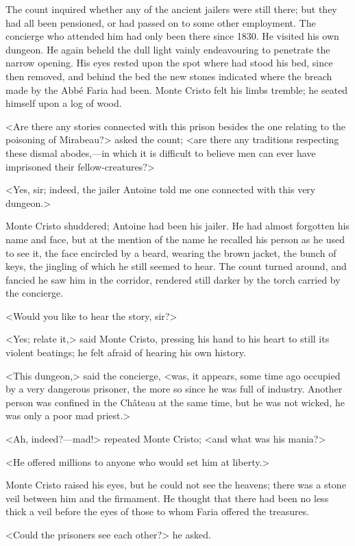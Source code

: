  The count inquired whether any of the ancient jailers were still there; but they had all been pensioned, or had passed on to some other employment. The concierge who attended him had only been there since 1830. He visited his own dungeon. He again beheld the dull light vainly endeavouring to penetrate the narrow opening. His eyes rested upon the spot where had stood his bed, since then removed, and behind the bed the new stones indicated where the breach made by the Abbé Faria had been. Monte Cristo felt his limbs tremble; he seated himself upon a log of wood. 

 <Are there any stories connected with this prison besides the one relating to the poisoning of Mirabeau?> asked the count; <are there any traditions respecting these dismal abodes,—in which it is difficult to believe men can ever have imprisoned their fellow-creatures?> 

 <Yes, sir; indeed, the jailer Antoine told me one connected with this very dungeon.> 

 Monte Cristo shuddered; Antoine had been his jailer. He had almost forgotten his name and face, but at the mention of the name he recalled his person as he used to see it, the face encircled by a beard, wearing the brown jacket, the bunch of keys, the jingling of which he still seemed to hear. The count turned around, and fancied he saw him in the corridor, rendered still darker by the torch carried by the concierge. 

 <Would you like to hear the story, sir?> 

 <Yes; relate it,> said Monte Cristo, pressing his hand to his heart to still its violent beatings; he felt afraid of hearing his own history. 

 <This dungeon,> said the concierge, <was, it appears, some time ago occupied by a very dangerous prisoner, the more so since he was full of industry. Another person was confined in the Château at the same time, but he was not wicked, he was only a poor mad priest.> 

 <Ah, indeed?—mad!> repeated Monte Cristo; <and what was his mania?> 

 <He offered millions to anyone who would set him at liberty.> 

 Monte Cristo raised his eyes, but he could not see the heavens; there was a stone veil between him and the firmament. He thought that there had been no less thick a veil before the eyes of those to whom Faria offered the treasures. 

 <Could the prisoners see each other?> he asked. 

